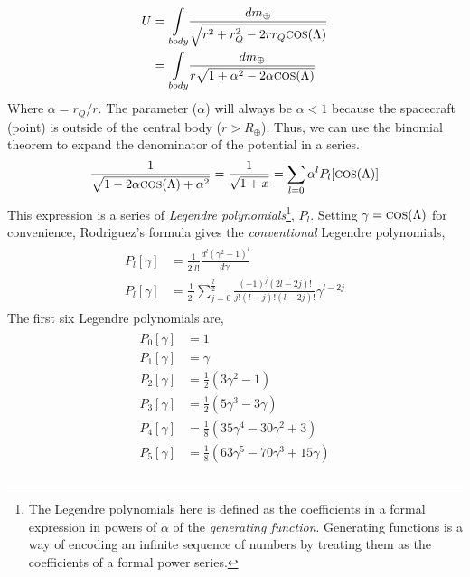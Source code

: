 \begin{multicols}{2}
\begin{gather}
\begin{split}
        U &= \underset{body}{\int}\frac{dm_\oplus}{\sqrt{r^2+r_Q^2-2rr_Q\text{\footnotesize{COS}}(\Lambda)}}\\
          &= \underset{body}{\int}\frac{dm_\oplus}{r\sqrt{1+\alpha^2-2\alpha\text{\footnotesize{COS}}(\Lambda)}}
    \end{split}
\end{gather}
Where $\alpha = r_Q/r$. The parameter ($\alpha$) will always be $\alpha<1$ because the spacecraft (point) is outside of the central body ($r>R_\oplus$). Thus, we can use the binomial theorem to expand the denominator of the potential in a series.
\begin{gather}
    \begin{split}
        \frac{1}{\sqrt{1-2\alpha\text{\footnotesize{COS}}(\Lambda)+\alpha^2}} = \frac{1}{\sqrt{1+x}} = \sum_{l=0}\alpha^lP_l[\text{\footnotesize{COS}}(\Lambda)]
    \end{split}
\end{gather}
This expression is a series of \textit{Legendre polynomials}\footnote{The Legendre polynomials here is defined as the coefficients in a formal expression in powers of $\alpha$ of the \textit{generating function}. Generating functions is a way of encoding an infinite sequence of numbers by treating them as the coefficients of a formal power series. }, $P_l$. Setting $\gamma = \text{\footnotesize{COS}}(\Lambda)$ for convenience, Rodriguez's formula gives the \textit{conventional} Legendre polynomials,
\begin{gather}
    \begin{split}
        P_l[\gamma] &= \frac{1}{2^ll!}\frac{d^l(\gamma^2-1)^l}{d\gamma^l}\\
        P_l[\gamma] &= \frac{1}{2^l}\sum_{j=0}^{\frac{l}{2}}\frac{(-1)^j(2l-2j)!}{j!(l-j)!(l-2j)!}\gamma^{l-2j}
    \end{split}
\end{gather}
The first six Legendre polynomials are,
\begin{gather}
    \begin{split}
        P_0[\gamma] &= 1\\
        P_1[\gamma] &= \gamma\\
        P_2[\gamma] &= \frac{1}{2}(3\gamma^2-1)\\
        P_3[\gamma] &= \frac{1}{2}(5\gamma^3-3\gamma)\\
        P_4[\gamma] &= \frac{1}{8}(35\gamma^4-30\gamma^2+3)\\
        P_5[\gamma] &= \frac{1}{8}(63\gamma^5-70\gamma^3+15\gamma)\\
        \label{eq:poly_terms}
    \end{split}

\end{gather}
\end{multicols}
